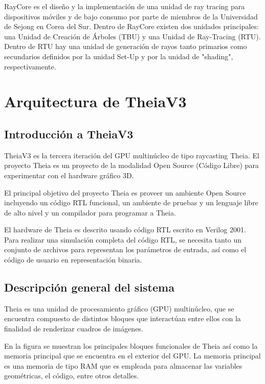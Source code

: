 RayCore es el diseño y la implementación de una unidad de ray tracing para dispositivos móviles y de bajo consumo por parte de miembros de la Universidad de Sejong en Corea del Sur. Dentro de RayCore existen dos unidades principales: una Unidad de Creación de Árboles (TBU) y una Unidad de Ray-Tracing (RTU). Dentro de RTU hay una unidad de generación de rayos tanto primarios como secundarios definidos por la unidad Set-Up y por la unidad de "shading", respectivamente.   


\section{Arquitectura de TheiaV3}
\subsection{Introducción a TheiaV3}
TheiaV3 es la tercera iteración del GPU multinúcleo de tipo raycasting Theia. El proyecto Theia es un proyecto de la modalidad Open Source (Código Libre) para experimentar con el hardware gráfico 3D.

El principal objetivo del proyecto Theia es proveer un ambiente Open Source incluyendo un código RTL funcional, un ambiente de pruebas y un lenguaje libre de alto nivel y un compilador para programar a Theia.

El hardware de Theia es descrito usando código RTL escrito en Verilog 2001. Para realizar una simulación completa del código RTL, se necesita tanto un conjunto de archivos para representan los parámetros de entrada, así como el código de usuario en representación binaria.  

\subsection{Descripción general del sistema}

Theia es una unidad de procesamiento gráfico (GPU) multinúcleo, que se encuentra compuesto de distintos bloques que interactúan entre ellos con la finalidad de renderizar cuadros de imágenes.

En la figura se muestran los principales bloques funcionales de Theia así como la memoria principal que se encuentra en el exterior del GPU. La memoria principal es una memoria de tipo RAM que es empleada para almacenar las variables geométricas, el código, entre otros detalles.

